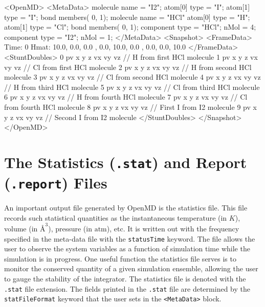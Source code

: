 \documentclass[letterpaper]{report}
\begin{document}
\begin{code}[caption={Example declaration of the
$\text{I}_2$ molecule and the HCl molecule in {\tt <MetaData>} and
{\tt <Snapshot>} blocks.  Note that even though $\text{I}_2$ is
declared before HCl, the {\tt <Snapshot>} block follows the order {\it in
which the components were included}.}, label=sch:initEx1] 
<OpenMD>
  <MetaData>
molecule{
  name = "I2";
  atom[0]{ type = "I"; }
  atom[1]{ type = "I"; }
  bond{ members( 0, 1); }
}
molecule{
  name = "HCl"
  atom[0]{ type = "H";}
  atom[1]{ type = "Cl";}
  bond{ members( 0, 1); }
}
component{
  type = "HCl";
  nMol = 4;
}
component{
  type = "I2";
  nMol = 1;
}
  </MetaData>
  <Snapshot>
    <FrameData>
        Time: 0
        Hmat: {{ 10.0, 0.0, 0.0 }, { 0.0, 10.0, 0.0 }, { 0.0, 0.0, 10.0 }}
    </FrameData>
    <StuntDoubles>
         0      pv          x y z vx vy vz // H from first HCl molecule 
         1      pv          x y z vx vy vz // Cl from first HCl molecule
         2      pv          x y z vx vy vz // H from second HCl molecule 
         3      pv          x y z vx vy vz // Cl from second HCl molecule
         4      pv          x y z vx vy vz // H from third HCl molecule 
         5      pv          x y z vx vy vz // Cl from third HCl molecule
         6      pv          x y z vx vy vz // H from fourth HCl molecule 
         7      pv          x y z vx vy vz // Cl from fourth HCl molecule
         8      pv          x y z vx vy vz // First I from I2 molecule
         9      pv          x y z vx vy vz // Second I from I2 molecule
    </StuntDoubles>
  </Snapshot>
</OpenMD>
\end{code}

\section{The Statistics ({\tt .stat}) and Report ({\tt .report}) Files}

An important output file generated by OpenMD is the statistics
file. This file records such statistical quantities as the
instantaneous temperature (in $K$), volume (in $\mbox{\AA}^{3}$),
pressure (in $\mbox{atm}$), etc. It is written out with the frequency
specified in the meta-data file with the
\texttt{statusTime} keyword. The file allows the user to observe the
system variables as a function of simulation time while the simulation
is in progress. One useful function the statistics file serves is to
monitor the conserved quantity of a given simulation ensemble,
allowing the user to gauge the stability of the integrator. The
statistics file is denoted with the \texttt{.stat} file extension.
The fields printed in the {\tt .stat} file are determined by the {\tt
  statFileFormat} keyword that the user sets in the {\tt <MetaData>} block.
\end{document}
